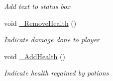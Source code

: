 \begin{DoxyCompactItemize}
\begin{DoxyCompactList}\small\item\em Add text to status box \end{DoxyCompactList}\item 
void \hyperlink{class_gruppe22_1_1_client_1_1_game_win_a8bf0adab6f6d63c39d6d77133114391b}{\-\_\-\-Remove\-Health} ()
\begin{DoxyCompactList}\small\item\em Indicate damage done to player \end{DoxyCompactList}\item 
void \hyperlink{class_gruppe22_1_1_client_1_1_game_win_aa6cf8983ae2ac894e2755459c3f4aa85}{\-\_\-\-Add\-Health} ()
\begin{DoxyCompactList}\small\item\em Indicate health regained by potions \end{DoxyCompactList}\end{DoxyCompactItemize}
